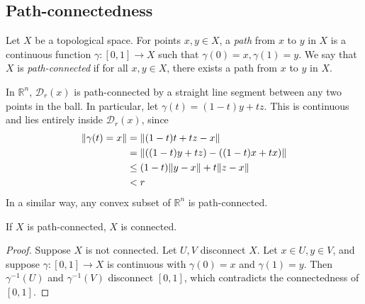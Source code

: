 \subsection{Path-connectedness}
\begin{definition}
	Let \( X \) be a topological space.
	For points \( x, y \in X \), a \textit{path} from \( x \) to \( y \) in \( X \) is a continuous function \( \gamma \colon [0,1] \to X \) such that \( \gamma(0) = x, \gamma(1) = y \).
	We say that \( X \) is \textit{path-connected} if for all \( x, y \in X \), there exists a path from \( x \) to \( y \) in \( X \).
\end{definition}
\begin{example}
	In \( \mathbb R^n \), \( \mathcal D_r(x) \) is path-connected by a straight line segment between any two points in the ball.
	In particular, let \( \gamma(t) = (1-t)y + tz \).
	This is continuous and lies entirely inside \( \mathcal D_r(x) \), since
	\begin{align*}
		\norm{\gamma(t) = x} & = \norm{(1-t)t + tz - x}           \\
		                     & = \norm{((1-t)y+tz)-((1-t)x+tx)}   \\
		                     & \leq (1-t)\norm{y-x} + t\norm{z-x} \\
		                     & < r
	\end{align*}
	In a similar way, any convex subset of \( \mathbb R^n \) is path-connected.
\end{example}
\begin{theorem}
	If \( X \) is path-connected, \( X \) is connected.
\end{theorem}
\begin{proof}
	Suppose \( X \) is not connected.
	Let \( U, V \) disconnect \( X \).
	Let \( x \in U, y \in V \), and suppose \( \gamma \colon [0,1] \to X \) is continuous with \( \gamma(0) = x \) and \( \gamma(1) = y \).
	Then \( \gamma^{-1}(U) \) and \( \gamma^{-1}(V) \) disconnect \( [0,1] \), which contradicts the connectedness of \( [0,1] \).
\end{proof}
